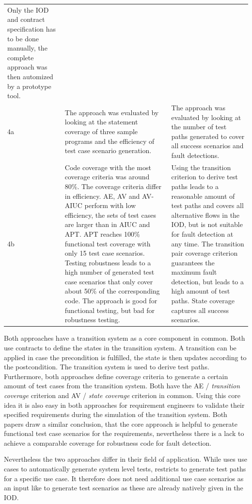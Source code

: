 \begin{longtable}[h]{p{0.5cm}p{}p{}}
	Only the IOD and contract specification has to be done manually, the complete approach was then automized by a prototype tool. \\
	4a & 
	The approach was evaluated by looking at the statement coverage of three sample programs and the efficiency of test case scenario generation. & 
	The approach was evaluated by looking at the number of test paths generated to cover all success scenarios and fault detections. \\
	4b &
	Code coverage with the most coverage criteria was around 80\%. The coverage criteria differ in efficiency. AE, AV and AV-AIUC perform with low efficiency, the sets of test cases are larger than in AIUC and APT. APT reaches 100\% functional test coverage with only 15 test case scenarios. Testing robustness leads to a high number of generated test case scenarios that only cover about 50\% of the corresponding code. The approach is good for functional testing, but bad for robustness testing. &
	Using the transition criterion to derive test paths leads to a reasonable amount of test paths and covers all alternative flows in the IOD, but is not suitable for fault detection at any time. The transition pair coverage criterion guarantees the maximum fault detection, but leads to a high amount of test paths. State coverage captures all success scenarios. \\
\end{longtable}

Both approaches have a transition system as a core component in common. Both use contracts to define the states in the transition system. A transition can be applied in case the precondition is fulfilled, the state is then updates according to the postcondition. The transition system is used to derive test paths. Furthermore, both approaches define coverage criteria to generate a certain amount of test cases from the transition system. Both have the AE / \textit{transition coverage} criterion and AV / \textit{state coverage} criterion in common. Using this core idea it is also easy in both approaches for requirement engineers to validate their specified requirements during the simulation of the transition system. Both papers draw a similar conclusion, that the core approach is helpful to generate functional test case scenarios for the requirements, nevertheless there is a lack to achieve a comparable coverage for robustness code for fault detection.

Nevertheless the two approaches differ in their field of application. While \cite{ClementineNebut2006} uses use cases to automatically generate system level tests, \cite{NajlaRaza2007} restricts to generate test paths for a specific use case. It therefore does not need additional use case scenarios as an input like \cite{ClementineNebut2006} to generate test scenarios as these are already natively given in the IOD. 

